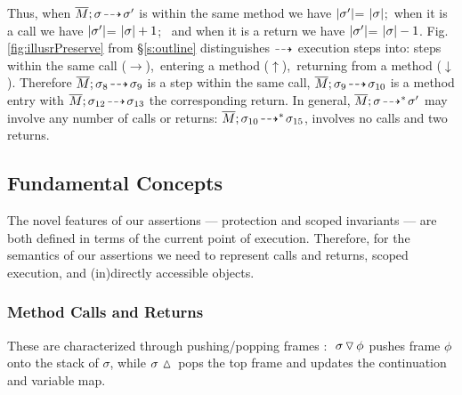 {Thus, when $\overline{M};\sigma\! \dashrightarrow\! {\sigma'} $ is within the same method we have  $|\sigma'|$= $|\sigma|$;\  when it is a call we have
 $|\sigma'|$= $|\sigma|+1$; \ and when it is a return we have  $|\sigma'|$= $|\sigma|-1$.}
Fig. \ref{fig:illusrPreserve}  from \S \ref{s:outline} %
distinguishes %
  ${\dashrightarrow}$ {execution} steps into: %
steps within the same  call ($\rightarrow$),\   entering a method  ($\uparrow$),\    returning from a method  ($\downarrow$).
Therefore $\overline{M};\sigma_8\! \dashrightarrow\! {\sigma_9} $ is a step within the same call, 
$\overline{M};\sigma_9\! \dashrightarrow\! {\sigma_{10}} $ is a method entry with $\overline{M};\sigma_{12}\! \dashrightarrow\! {\sigma_{13}} $
the corresponding return. 
In general,  $\overline{M};\sigma\! \dashrightarrow^*\! {\sigma'}$ may involve {any}  number of  calls or returns: \eg
$\overline{M};\sigma_{10}\! \dashrightarrow^*\! {\sigma_{15}}$,   involves no calls and two returns.


%
 

\subsection{Fundamental  Concepts}
\label{s:auxiliary}

The novel features of our assertions — protection and scoped invariants  
— are both defined in terms of the current point of execution.
Therefore, for the semantics of our   assertions we need to represent calls and returns, scoped execution, and (in)directly accessible objects.
 
 \subsubsection{Method Calls and Returns} These  are characterized through pushing/popping   frames :
$  \ {\sigma} \, {\triangledown}\, {\phi} $ pushes 
frame $\phi$ onto the stack of $\sigma$, while
${\sigma\, \, {\vartriangle}\,}$   pops the top frame %
and updates the continuation and variable map.

